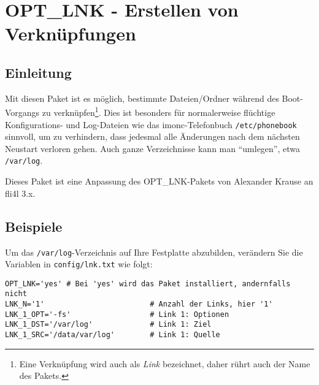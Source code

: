 {
\section {OPT\_LNK - Erstellen von Verknüpfungen}
}

\subsection {Einleitung}

Mit diesen Paket ist es möglich, bestimmte Dateien/Ordner während des
Boot-Vorgangs zu verknüpfen\footnote{Eine Verknüpfung wird auch als \emph{Link}
bezeichnet, daher rührt auch der Name des Pakets.}. Dies ist besonders für
normalerweise flüchtige Konfigurations- und Log-Dateien wie das
imonc-Telefonbuch \texttt{/etc/phonebook} sinnvoll, um zu verhindern, dass
jedesmal alle Änderungen nach dem nächsten Neustart verloren gehen. Auch ganze
Verzeichnisse kann man ``umlegen'', etwa \texttt{/var/log}.

Dieses Paket ist eine Anpassung des OPT\_LNK-Pakets von Alexander Krause an
fli4l 3.x.

\subsection {Beispiele}

Um das \texttt{/var/log}-Verzeichnis auf Ihre Festplatte abzubilden, verändern
Sie die Variablen in \texttt{config/lnk.txt} wie folgt:

\begin{small}
\begin{example}
\begin{verbatim}
OPT_LNK='yes' # Bei 'yes' wird das Paket installiert, andernfalls nicht
LNK_N='1'                        # Anzahl der Links, hier '1'
LNK_1_OPT='-fs'                  # Link 1: Optionen
LNK_1_DST='/var/log'             # Link 1: Ziel
LNK_1_SRC='/data/var/log'        # Link 1: Quelle
\end{verbatim}
\end{example}
\end{small}


